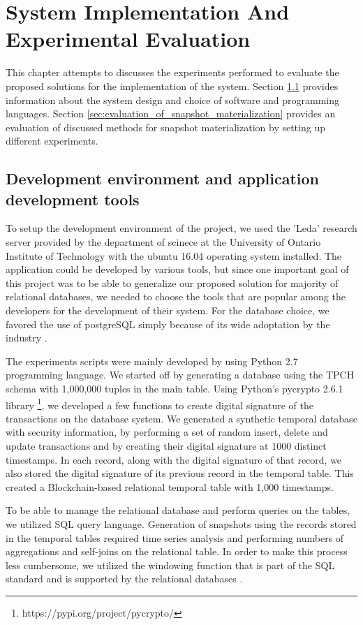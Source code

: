 \chapter{System Implementation And Experimental Evaluation} \label{chap:system_implementation}
    This chapter attempts to discusses the experiments performed to evaluate the proposed solutions for the implementation of the system. Section \ref{sec:development environment} provides information about the system design and choice of software and programming languages. Section \ref{sec:evaluation_of_snapshot_materialization} provides an evaluation of discussed methods for snapshot materialization by setting up different experiments. 

	\section{Development environment and application development tools} \label{sec:development environment}
		To setup the development environment of the project, we used the 'Leda' research server provided by the department of scinece at the University of Ontario Institute of Technology with the ubuntu 16.04 operating system installed. The application could be developed by various tools, but since one important goal of this project was to be able to generalize our proposed solution for majority of relational databases, we needed to choose the tools that are popular among the developers for the development of their system. For the database choice, we favored the use of postgreSQL simply because of its wide adoptation by the industry \cite{cook2017docker}. 

		The experiments scripts were mainly developed by using Python 2.7 programming language. We started off by generating a database using the TPCH schema with 1,000,000 tuples in the main table. Using Python's pycrypto 2.6.1 library \footnote{https://pypi.org/project/pycrypto/}, we developed a few functions to create digital signature of the transactions on the database system. We generated a synthetic temporal database with security information, by performing a set of random insert, delete and update transactions and by creating their digital signature at 1000 distinct timestamps. In each record, along with the digital signature of that record, we also stored the digital signature of its previous record in the temporal table. This created a Blockchain-based relational temporal table with 1,000 timestamps. 

		To be able to manage the relational database and perform queries on the tables, we utilized SQL query language. Generation of snapshots using the records stored in the temporal tables required time series analysis and performing numbers of aggregations and self-joins on the relational table. In order to make this process less cumbersome, we utilized the windowing function that is part of the SQL standard and is supported by the relational databases \cite{leis2015efficient}.

